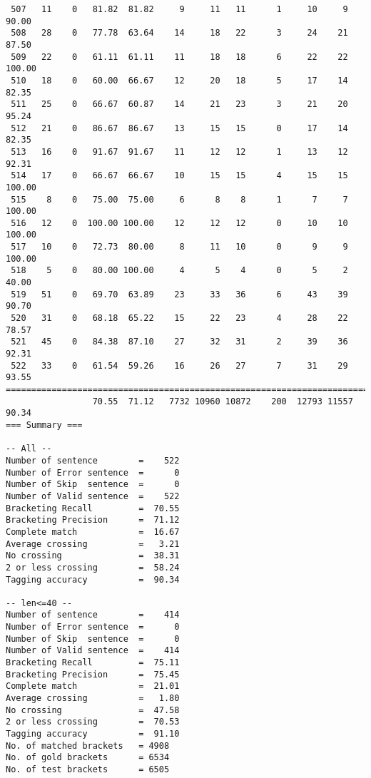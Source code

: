 \begin{verbatim}
 507   11    0   81.82  81.82     9     11   11      1     10     9    90.00
 508   28    0   77.78  63.64    14     18   22      3     24    21    87.50
 509   22    0   61.11  61.11    11     18   18      6     22    22   100.00
 510   18    0   60.00  66.67    12     20   18      5     17    14    82.35
 511   25    0   66.67  60.87    14     21   23      3     21    20    95.24
 512   21    0   86.67  86.67    13     15   15      0     17    14    82.35
 513   16    0   91.67  91.67    11     12   12      1     13    12    92.31
 514   17    0   66.67  66.67    10     15   15      4     15    15   100.00
 515    8    0   75.00  75.00     6      8    8      1      7     7   100.00
 516   12    0  100.00 100.00    12     12   12      0     10    10   100.00
 517   10    0   72.73  80.00     8     11   10      0      9     9   100.00
 518    5    0   80.00 100.00     4      5    4      0      5     2    40.00
 519   51    0   69.70  63.89    23     33   36      6     43    39    90.70
 520   31    0   68.18  65.22    15     22   23      4     28    22    78.57
 521   45    0   84.38  87.10    27     32   31      2     39    36    92.31
 522   33    0   61.54  59.26    16     26   27      7     31    29    93.55
============================================================================
                 70.55  71.12   7732 10960 10872    200  12793 11557    90.34
=== Summary ===

-- All --
Number of sentence        =    522
Number of Error sentence  =      0
Number of Skip  sentence  =      0
Number of Valid sentence  =    522
Bracketing Recall         =  70.55
Bracketing Precision      =  71.12
Complete match            =  16.67
Average crossing          =   3.21
No crossing               =  38.31
2 or less crossing        =  58.24
Tagging accuracy          =  90.34

-- len<=40 --
Number of sentence        =    414
Number of Error sentence  =      0
Number of Skip  sentence  =      0
Number of Valid sentence  =    414
Bracketing Recall         =  75.11
Bracketing Precision      =  75.45
Complete match            =  21.01
Average crossing          =   1.80
No crossing               =  47.58
2 or less crossing        =  70.53
Tagging accuracy          =  91.10
No. of matched brackets   = 4908
No. of gold brackets      = 6534
No. of test brackets      = 6505

\end{verbatim}

\normalsize

